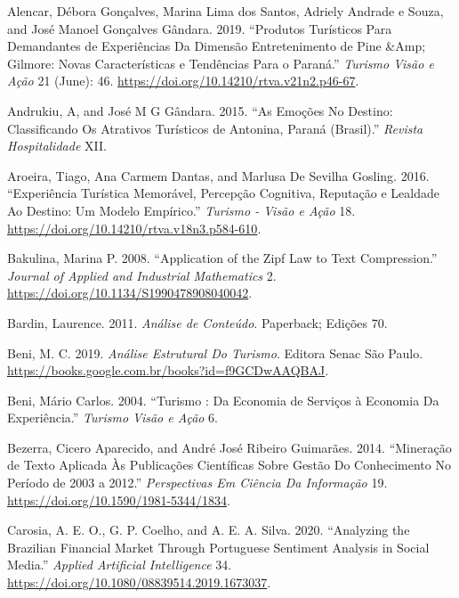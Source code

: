 \documentclass[preprint, 3p,
authoryear]{elsarticle} %
\newlength{\cslhangindent}
\newlength{\cslentryspacingunit} %
\newenvironment{CSLReferences}[2] %
 {%
  \setlength{\parindent}{0pt}
  \ifodd #1
  \let\oldpar\par
  \def\par{\hangindent=\cslhangindent\oldpar}
  \fi
  \setlength{\parskip}{#2\cslentryspacingunit}
 }%
 {}
\begin{document}
\hypertarget{refs}{}
\begin{CSLReferences}{1}{0}
\leavevmode{}%
Alencar, Débora Gonçalves, Marina Lima dos Santos, Adriely Andrade e
Souza, and José Manoel Gonçalves Gândara. 2019. {``Produtos Turísticos
Para Demandantes de Experiências Da Dimensão Entretenimento de Pine
\&Amp; Gilmore: Novas Características e Tendências Para o Paraná.''}
\emph{Turismo Visão e Ação} 21 (June): 46.
\url{https://doi.org/10.14210/rtva.v21n2.p46-67}.

\leavevmode{}%
Andrukiu, A, and José M G Gândara. 2015. {``As Emoções No Destino:
Classificando Os Atrativos Turísticos de Antonina, Paraná (Brasil).''}
\emph{Revista Hospitalidade} XII.

\leavevmode{}%
Aroeira, Tiago, Ana Carmem Dantas, and Marlusa De Sevilha Gosling. 2016.
{``Experiência Turística Memorável, Percepção Cognitiva, Reputação e
Lealdade Ao Destino: Um Modelo Empírico.''} \emph{Turismo - Visão e
Ação} 18. \url{https://doi.org/10.14210/rtva.v18n3.p584-610}.

\leavevmode{}%
Bakulina, Marina P. 2008. {``Application of the Zipf Law to Text
Compression.''} \emph{Journal of Applied and Industrial Mathematics} 2.
\url{https://doi.org/10.1134/S1990478908040042}.

\leavevmode{}%
Bardin, Laurence. 2011. \emph{Análise de Conteúdo}. Paperback; Edições
70.

\leavevmode{}%
Beni, M. C. 2019. \emph{An{á}lise Estrutural Do Turismo}. Editora Senac
S{ã}o Paulo. \url{https://books.google.com.br/books?id=f9GCDwAAQBAJ}.

\leavevmode{}%
Beni, Mário Carlos. 2004. {``Turismo : Da Economia de Serviços à
Economia Da Experiência.''} \emph{Turismo Visão e Ação} 6.

\leavevmode{}%
Bezerra, Cicero Aparecido, and André José Ribeiro Guimarães. 2014.
{``Mineração de Texto Aplicada Às Publicações Científicas Sobre Gestão
Do Conhecimento No Período de 2003 a 2012.''} \emph{Perspectivas Em
Ciência Da Informação} 19. \url{https://doi.org/10.1590/1981-5344/1834}.

\leavevmode{}%
Carosia, A. E. O., G. P. Coelho, and A. E. A. Silva. 2020. {``Analyzing
the Brazilian Financial Market Through Portuguese Sentiment Analysis in
Social Media.''} \emph{Applied Artificial Intelligence} 34.
\url{https://doi.org/10.1080/08839514.2019.1673037}.


\end{CSLReferences}
\end{document}
